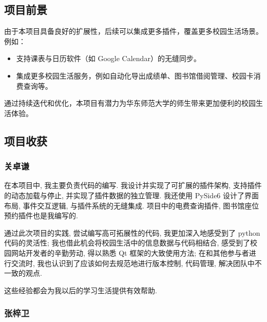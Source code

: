 \documentclass[14pt,a4paper,UTF8,twoside]{article}
\begin{document}
\subsection{项目前景}

由于本项目具备良好的扩展性，后续可以集成更多插件，覆盖更多校园生活场景。例如：

\begin{itemize}
    \item 支持课表与日历软件（如 Google Calendar）的无缝同步。
    \item 集成更多校园生活服务，例如自动化导出成绩单、图书馆借阅管理、校园卡消费查询等。
\end{itemize}

通过持续迭代和优化，本项目有潜力为华东师范大学的师生带来更加便利的校园生活体验。

\newpage{}

\subsection{项目收获}

\subsubsection*{关卓谦}

\begin{Thought}
在本项目中, 我主要负责代码的编写.
我设计并实现了可扩展的插件架构, 支持插件的动态加载与停止, 并实现了插件数据的独立管理.
我还使用 PySide6 设计了界面布局, 事件交互逻辑, 与插件系统的无缝集成.
项目中的电费查询插件, 图书馆座位预约插件也是我编写的.

\vspace{0.3cm}

通过此次项目的实践, 尝试编写高可拓展性的代码, 我更加深入地感受到了 python 代码的灵活性;
我也借此机会将校园生活中的信息数据与代码相结合, 感受到了校园网站开发者的辛勤劳动, 得以熟悉 Qt 框架的大致使用方法;
在和其他参与者进行交流时, 我也认识到了应该如何去规范地进行版本控制, 代码管理, 解决团队中不一致的观点.

\vspace{0.3cm}

这些经验都会为我以后的学习生活提供有效帮助.

\end{Thought}

\subsubsection*{张梓卫}
\end{document}
